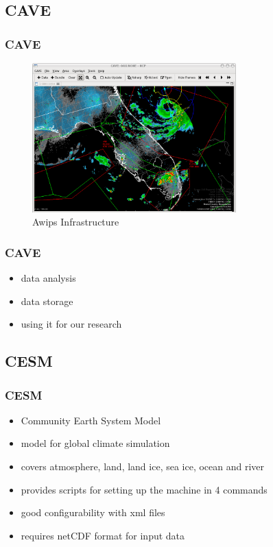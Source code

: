 \documentclass[compress]{beamer}
\begin{document}
\subsection{CAVE}
\begin{frame}
    \frametitle{CAVE}
    \begin{center}
    	\begin{figure}
			\includegraphics[width=0.7\textwidth]{gfx/Unidata_AWIPS2_CAVE.png}
      	  	\caption[]{Awips Infrastructure \cite{Uni01}}
		\end{figure}
	\end{center}
\end{frame}

\begin{frame}
    \frametitle{CAVE}
    \begin{itemize}
        \item data analysis \cite{AwipsDocs} %
        \item data storage %
        \item using it for our research
	\end{itemize}
\end{frame}

\subsection{CESM}
\begin{frame}
    \frametitle{CESM}
    	\begin{itemize}
    	    \item Community Earth System Model
			\item model for global climate simulation
			\item covers atmosphere, land, land ice, sea ice, ocean and river
			\item provides scripts for setting up the machine in 4 commands
		    \item good configurability with xml files
		    \item requires netCDF format for input data \cite{CESMDocs}
		\end{itemize}
\end{frame}
\end{document}
